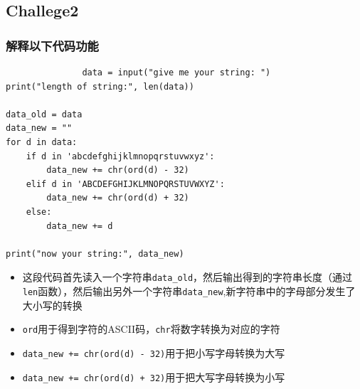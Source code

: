 \documentclass{article}
\begin{document}
        \subsection*{Challege2}
           \subsubsection*{解释以下代码功能}
           \begin{verbatim}
               data = input("give me your string: ")
print("length of string:", len(data))

data_old = data
data_new = ""
for d in data:
    if d in 'abcdefghijklmnopqrstuvwxyz':
        data_new += chr(ord(d) - 32)
    elif d in 'ABCDEFGHIJKLMNOPQRSTUVWXYZ':
        data_new += chr(ord(d) + 32)
    else:
        data_new += d

print("now your string:", data_new)
           \end{verbatim}  
          \begin{itemize}
          \item 这段代码首先读入一个字符串\texttt{data_old}，然后输出得到的字符串长度（通过\texttt{len}函数），然后输出另外一个字符串\texttt{data_new},新字符串中的字母部分发生了大小写的转换 
          \item \texttt{ord}用于得到字符的ASCII码，\texttt{chr}将数字转换为对应的字符
          \item \texttt{data_new += chr(ord(d) - 32)}用于把小写字母转换为大写
          \item \texttt{data_new += chr(ord(d) + 32)}用于把大写字母转换为小写
          \end{itemize}
\end{document}
